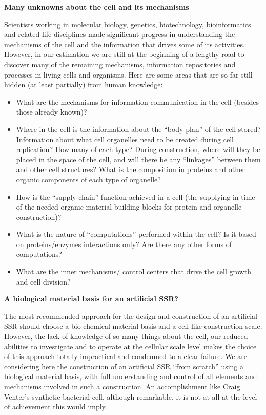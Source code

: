 \documentclass[letterpaper]{article}
\begin{document}
\bigskip

\textbf{Many unknowns about the cell and its mechanisms}


\bigskip

Scientists working in molecular biology, genetics, biotechnology,
bioinformatics and related life disciplines made significant progress
in understanding the mechanisms of the cell and the information that
drives some of its activities. However, in our estimation we are still
at the beginning of a lengthy road to discover many of the remaining
mechanisms, information repositories and processes in living cells and
organisms. Here are some areas that are so far still hidden (at least
partially) from human knowledge:


\bigskip

\begin{itemize}
\item What are the mechanisms for information communication in the cell
(besides those already known)?
\item Where in the cell is the information about the “body plan” of the
cell stored? Information about what cell organelles need to be created
during cell replication? How many of each type? During construction,
where will they be placed in the space of the cell, and will there be
any “linkages” between them and other cell structures? What is the
composition in proteins and other organic components of each type of
organelle?
\item How is the “supply-chain” function achieved in a cell (the
supplying in time of the needed organic material building blocks for
protein and organelle construction)?
\item What is the nature of “computations” performed within the cell? Is
it based on proteins/enzymes interactions only? Are there any other
forms of computations?
\item What are the inner mechanisms/ control centers that drive the cell
growth and cell division?
\end{itemize}

\bigskip

\textbf{A biological material basis for an artificial SSR?}


\bigskip

The most recommended approach for the design and construction of an
artificial SSR should choose a bio-chemical material basis and a
cell-like construction scale. However, the lack of knowledge of so many
things about the cell, our reduced abilities to investigate and to
operate at the cellular scale level makes the choice of this approach
totally impractical and condemned to a clear failure. We are
considering here the construction of an artificial SSR “from scratch”
using a biological material basis, with full understanding and control
of all elements and mechanisms involved in such a construction. An
accomplishment like Craig Venter’s synthetic bacterial cell, although
remarkable, it is not at all at the level of achievement this would
imply.
\end{document}
